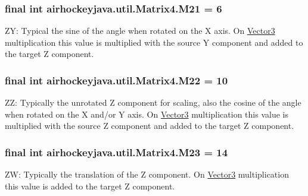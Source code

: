 \subsubsection[{M21}]{\setlength{\rightskip}{0pt plus 5cm}final int airhockeyjava.\+util.\+Matrix4.\+M21 = 6\hspace{0.3cm}{\ttfamily [static]}}\label{classairhockeyjava_1_1util_1_1_matrix4_a238f57ac1896ecb261e4d6ad0ef70c08}
Z\+Y\+: Typical the sine of the angle when rotated on the X axis. On \hyperlink{classairhockeyjava_1_1util_1_1_vector3}{Vector3} multiplication this value is multiplied with the source Y component and added to the target Z component. \hypertarget{classairhockeyjava_1_1util_1_1_matrix4_a4702850982b76363406d25f53a6fd292}{}
\subsubsection[{M22}]{\setlength{\rightskip}{0pt plus 5cm}final int airhockeyjava.\+util.\+Matrix4.\+M22 = 10\hspace{0.3cm}{\ttfamily [static]}}\label{classairhockeyjava_1_1util_1_1_matrix4_a4702850982b76363406d25f53a6fd292}
Z\+Z\+: Typically the unrotated Z component for scaling, also the cosine of the angle when rotated on the X and/or Y axis. On \hyperlink{classairhockeyjava_1_1util_1_1_vector3}{Vector3} multiplication this value is multiplied with the source Z component and added to the target Z component. \hypertarget{classairhockeyjava_1_1util_1_1_matrix4_a0595b8bcc8a9b6efcdd76707983aa931}{}
\subsubsection[{M23}]{\setlength{\rightskip}{0pt plus 5cm}final int airhockeyjava.\+util.\+Matrix4.\+M23 = 14\hspace{0.3cm}{\ttfamily [static]}}\label{classairhockeyjava_1_1util_1_1_matrix4_a0595b8bcc8a9b6efcdd76707983aa931}
Z\+W\+: Typically the translation of the Z component. On \hyperlink{classairhockeyjava_1_1util_1_1_vector3}{Vector3} multiplication this value is added to the target Z component. \hypertarget{classairhockeyjava_1_1util_1_1_matrix4_ad2d49245936af678e5fba9da47a18159}{}
